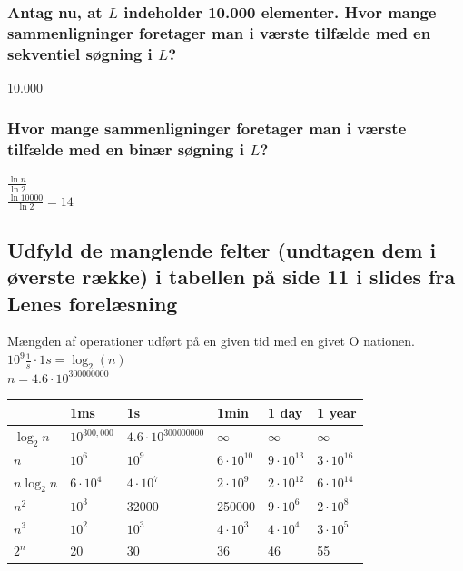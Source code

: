 \documentclass[12pt, a4paper]{article}
\begin{document}
			\subsubsection{Antag nu, at $L$ indeholder 10.000 elementer. Hvor mange sammenligninger foretager man i værste tilfælde med en sekventiel søgning i $L$?}
				10.000
			\subsubsection{Hvor mange sammenligninger foretager man i værste tilfælde med en binær søgning i $L$?}
				$\frac{\ln{n}}{\ln{2}}$\\
				$\frac{\ln{10000}}{\ln{2}}=14$
		\subsection{Udfyld de manglende felter (undtagen dem i øverste række) i tabellen
på side 11 i slides fra Lenes forelæsning}
			Mængden af operationer udført på en given tid med en givet O nationen.\\
			$10^9\frac{1}{\si{s}}\cdot 1\si{s}=\log_2(n)$\\
			$n=4.6\cdot 10^{300000000}$\\
			\begin{table}[h!]
			\begin{tabular}{|l|l|l|l|l|l|}
			\hline
			 		& 1ms 		& 1s 		& 1min 			& 1 day 			& 1 year \\\hline
			$\log_2 n$   & $10^{300,000}$ 	&      $4.6\cdot 10^{300000000}$   	&                   $\infty$		&                $\infty$   		&    $\infty$         \\\hline
			$n$               & $10^6$                & $10^9$ 	& $6\cdot 10^{10}$ 	& $9\cdot 10^{13}$ 	& $3\cdot 10^{16}$ \\\hline
			$n \log_2 n$ & $6\cdot 10^4$ 	&    $4\cdot 10^7$               &  $2\cdot 10^9$                                      & $2\cdot 10^{12} $	&   $6 \cdot 10^{14}$                                   \\\hline
			$n^2$  	& $10^3$                &     32000              &   250000   			           & $9\cdot 10^6$      	&    $2\cdot 10^8$                       \\\hline
			$n^3$           & $10^2$                & $10^3$ 	&               $4\cdot 10^3$ 		           & $4\cdot 10^4$      	&   $3\cdot 10^5$                                                  \\\hline
			$2^n$       	& 20                         & 30   	&             36              		&         46                          	& 55             \\                                    \hline
			\end{tabular}
			\end{table}
\end{document}
